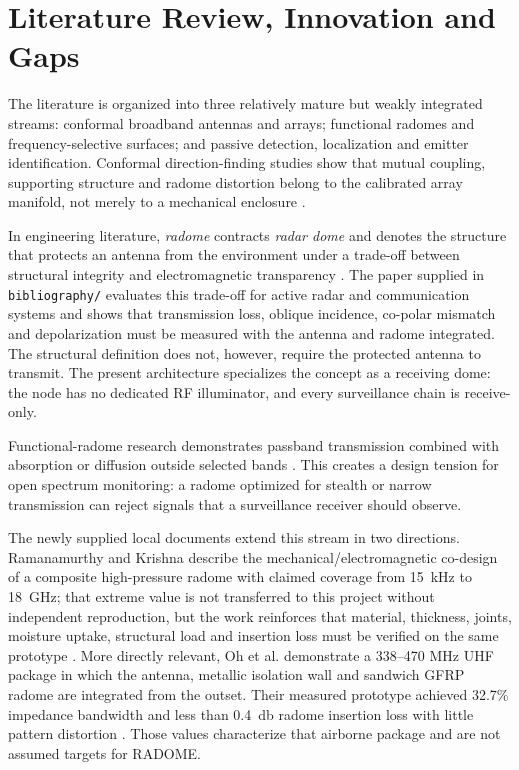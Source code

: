 \chapter{Literature Review, Innovation and Gaps}

The literature is organized into three relatively mature but weakly integrated streams: conformal broadband antennas and arrays; functional radomes and frequency-selective surfaces; and passive detection, localization and emitter identification. Conformal direction-finding studies show that mutual coupling, supporting structure and radome distortion belong to the calibrated array manifold, not merely to a mechanical enclosure \cite{caratelli2011,liberal2011}.

In engineering literature, \emph{radome} contracts \emph{radar dome} and denotes the structure that protects an antenna from the environment under a trade-off between structural integrity and electromagnetic transparency \cite{qamar2020}. The paper supplied in \texttt{bibliography/} evaluates this trade-off for active radar and communication systems and shows that transmission loss, oblique incidence, co-polar mismatch and depolarization must be measured with the antenna and radome integrated. The structural definition does not, however, require the protected antenna to transmit. The present architecture specializes the concept as a receiving dome: the node has no dedicated RF illuminator, and every surveillance chain is receive-only.

Functional-radome research demonstrates passband transmission combined with absorption or diffusion outside selected bands \cite{costa2012,lv2021,omar2018,sheng2024}. This creates a design tension for open spectrum monitoring: a radome optimized for stealth or narrow transmission can reject signals that a surveillance receiver should observe.

The newly supplied local documents extend this stream in two directions. Ramanamurthy and Krishna describe the mechanical/electromagnetic co-design of a composite high-pressure radome with claimed coverage from \SI{15}{\kilo\hertz} to \SI{18}{\giga\hertz}; that extreme value is not transferred to this project without independent reproduction, but the work reinforces that material, thickness, joints, moisture uptake, structural load and insertion loss must be verified on the same prototype \cite{ramanamurthy2016}. More directly relevant, Oh et al. demonstrate a 338--470 MHz UHF package in which the antenna, metallic isolation wall and sandwich GFRP radome are integrated from the outset. Their measured prototype achieved 32.7\% impedance bandwidth and less than \SI{0.4}{\decibel} radome insertion loss with little pattern distortion \cite{oh2026}. Those values characterize that airborne package and are not assumed targets for RADOME.

